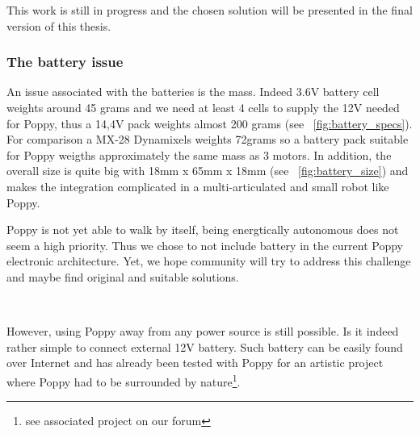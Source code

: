 This work is still in progress and the chosen solution will be presented in the final version of this thesis.


\subsubsection{The battery issue} %

An issue associated with the batteries is the mass. Indeed 3.6V battery cell weights around 45 grams and we need at least 4 cells to supply the 12V needed for Poppy, thus a 14,4V pack weights almost 200 grams (see \figurename~\ref{fig:battery_specs}). For comparison a MX-28 Dynamixels weights 72grams so a battery pack suitable for Poppy weigths approximately the same mass as 3 motors.
In addition, the overall size is quite big with 18mm x 65mm x 18mm (see \figurename~\ref{fig:battery_size}) and makes the integration complicated in a multi-articulated and small robot like Poppy.

Poppy is not yet able to walk by itself, being energtically autonomous does not seem a high priority. Thus we chose to not include battery in the current Poppy electronic architecture. Yet, we hope community will try to address this challenge and maybe find original and suitable solutions.

\begin{figure}[tb]
\centering
    \hfil
    \\
    \caption{}
    \label{fig:tyva_batteries}
\end{figure}

However, using Poppy away from any power source is still possible. Is it indeed rather simple to connect external 12V battery. Such battery can be easily found over Internet and has already been tested with Poppy for an artistic project where Poppy had to be surrounded by nature\footnote{see associated project on our forum}.






